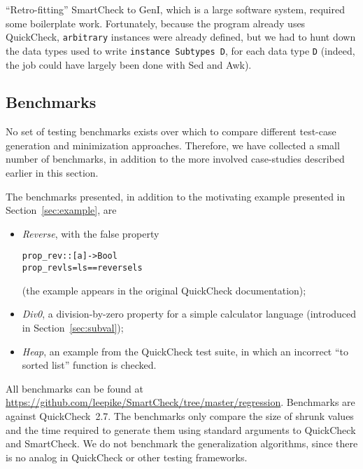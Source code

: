 \documentclass{sigplanconf}
\newenvironment{code}{\begin{alltt}\footnotesize}{\end{alltt}}
\newcommand{\ttp}[1]{\texttt{#1}}
\begin{document}
``Retro-fitting'' SmartCheck to GenI, which is a large software system, required
some boilerplate work.  Fortunately, because the program already uses
QuickCheck, \ttp{arbitrary} instances were already defined, but we had to hunt
down the data types used to write \ttp{instance Subtypes D}, for each data type
\ttp{D} (indeed, the job could have largely been done with Sed and Awk).


\subsection{Benchmarks}

No set of testing benchmarks exists over which to compare different test-case
generation and minimization approaches.  Therefore, we have collected a small
number of benchmarks, in addition to the more involved case-studies described
earlier in this section.

The benchmarks presented, in addition to the motivating example presented in
Section~\ref{sec:example}, are

\begin{itemize}
  \item  \emph{Reverse}, with the false property
\begin{code}
prop_rev :: [a] -> Bool
prop_rev ls = ls == reverse ls
\end{code}
\noindent
(the example appears in the original QuickCheck documentation);

  \item \emph{Div0}, a division-by-zero property for a simple calculator
    language (introduced in Section~\ref{sec:subval});

  \item \emph{Heap}, an example from the QuickCheck test suite, in which an
    incorrect ``to sorted list'' function is checked.
\end{itemize}

\noindent
All benchmarks can be found at
\url{https://github.com/leepike/SmartCheck/tree/master/regression}.  Benchmarks
are against QuickCheck~2.7.   The benchmarks only compare the size of shrunk
values and the time required to generate them using standard arguments to
QuickCheck and SmartCheck.  We do not benchmark the generalization algorithms,
since there is no analog in QuickCheck  or other testing frameworks.

\end{document}
